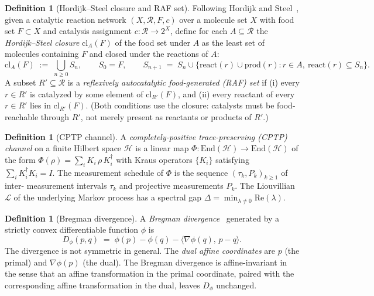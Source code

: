 \documentclass[11pt,a4paper]{article}
\theoremstyle{plain}
\theoremstyle{definition}
\newtheorem{definition}[theorem]{Definition}
\theoremstyle{remark}
\newcommand{\HH}{\mathcal{H}}
\newcommand{\End}{\mathrm{End}}
\begin{document}
\begin{definition}[Hordijk--Steel closure and RAF set]
\label{def:raf}
Following Hordijk and Steel~\cite{steel2004,hordijk2011}, given a
catalytic reaction network $(X, \mathcal{R}, F, c)$ over a molecule set
$X$ with food set $F\subset X$ and catalysis assignment $c:\mathcal{R}
\to 2^X$, define for each $A\subseteq\mathcal{R}$ the
\emph{Hordijk--Steel closure} $\mathrm{cl}_{A}(F)$ of the food set
under $A$ as the least set of molecules containing $F$ and closed
under the reactions of $A$:
\begin{equation}\label{eq:hs-closure}
  \mathrm{cl}_{A}(F) \;:=\; \bigcup_{n\geq 0} S_{n}, \qquad
  S_{0}=F,\qquad
  S_{n+1} \;=\; S_{n}\cup\bigl\{\mathrm{react}(r)\cup\mathrm{prod}(r):
  r\in A,\ \mathrm{react}(r)\subseteq S_{n}\bigr\}.
\end{equation}
A subset $R'\subseteq\mathcal{R}$ is a \emph{reflexively
autocatalytic food-generated (RAF) set} if (i) every $r\in R'$ is
catalyzed by some element of $\mathrm{cl}_{R'}(F)$, and (ii) every
reactant of every $r\in R'$ lies in $\mathrm{cl}_{R'}(F)$. (Both
conditions use the closure: catalysts must be food-reachable through
$R'$, not merely present as reactants or products of $R'$.)
\end{definition}

\begin{definition}[CPTP channel]
\label{def:cptp}
A \emph{completely-positive trace-preserving (CPTP) channel} on a finite
Hilbert space $\HH$ is a linear map $\Phi:\End(\HH)\to\End(\HH)$ of the
form $\Phi(\rho)=\sum_i K_i\,\rho\,K_i^\dagger$ with Kraus operators
$\{K_i\}$ satisfying $\sum_i K_i^\dagger K_i = I$. The measurement
schedule of $\Phi$ is the sequence $(\tau_k, P_k)_{k\geq 1}$ of inter-
measurement intervals $\tau_k$ and projective measurements $P_k$. The
Liouvillian $\mathcal{L}$ of the underlying Markov process has a spectral
gap $\Delta = \min_{\lambda\neq 0}\mathrm{Re}(\lambda)$.
\end{definition}

\begin{definition}[Bregman divergence]
\label{def:bregman}
A \emph{Bregman divergence}~\cite{bregman1967,amari2000} generated by
a strictly convex differentiable function $\phi$ is
\begin{equation}
  D_\phi(p,q) \;=\; \phi(p) - \phi(q) - \langle\nabla\phi(q),\, p-q\rangle.
\end{equation}
The divergence is not symmetric in general. The \emph{dual affine
coordinates} are $p$ (the primal) and $\nabla\phi(p)$ (the dual). The
Bregman divergence is affine-invariant in the sense that an affine
transformation in the primal coordinate, paired with the corresponding
affine transformation in the dual, leaves $D_\phi$ unchanged.
\end{definition}
\end{document}
